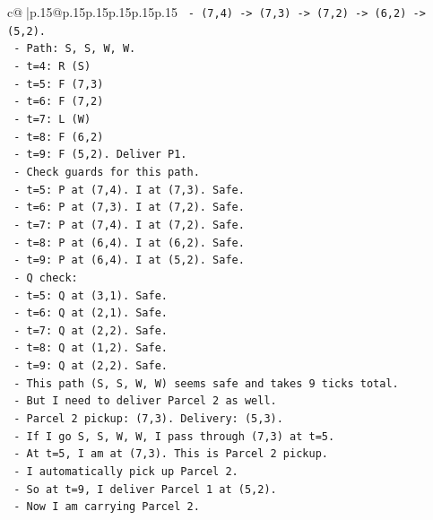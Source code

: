 \documentclass{article}
\begin{document}
{\begin{supertabular}{c@{$\;$}|p{.15\linewidth}@{}p{.15\linewidth}p{.15\linewidth}p{.15\linewidth}p{.15\linewidth}p{.15\linewidth}}
{{{\texttt{          {-} (7,4) {-}> (7,3) {-}> (7,2) {-}> (6,2) {-}> (5,2).} \\
\texttt{          {-} Path: S, S, W, W.} \\
\texttt{          {-} t=4: R (S)} \\
\texttt{          {-} t=5: F (7,3)} \\
\texttt{          {-} t=6: F (7,2)} \\
\texttt{          {-} t=7: L (W)} \\
\texttt{          {-} t=8: F (6,2)} \\
\texttt{          {-} t=9: F (5,2). Deliver P1.} \\
\texttt{          {-} Check guards for this path.} \\
\texttt{          {-} t=5: P at (7,4). I at (7,3). Safe.} \\
\texttt{          {-} t=6: P at (7,3). I at (7,2). Safe.} \\
\texttt{          {-} t=7: P at (7,4). I at (7,2). Safe.} \\
\texttt{          {-} t=8: P at (6,4). I at (6,2). Safe.} \\
\texttt{          {-} t=9: P at (6,4). I at (5,2). Safe.} \\
\texttt{          {-} Q check:} \\
\texttt{          {-} t=5: Q at (3,1). Safe.} \\
\texttt{          {-} t=6: Q at (2,1). Safe.} \\
\texttt{          {-} t=7: Q at (2,2). Safe.} \\
\texttt{          {-} t=8: Q at (1,2). Safe.} \\
\texttt{          {-} t=9: Q at (2,2). Safe.} \\
\texttt{        {-} This path (S, S, W, W) seems safe and takes 9 ticks total.} \\
\texttt{        {-} But I need to deliver Parcel 2 as well.} \\
\texttt{        {-} Parcel 2 pickup: (7,3). Delivery: (5,3).} \\
\texttt{        {-} If I go S, S, W, W, I pass through (7,3) at t=5.} \\
\texttt{        {-} At t=5, I am at (7,3). This is Parcel 2 pickup.} \\
\texttt{        {-} I automatically pick up Parcel 2.} \\
\texttt{        {-} So at t=9, I deliver Parcel 1 at (5,2).} \\
\texttt{        {-} Now I am carrying Parcel 2.} \\
}}}
\end{supertabular}}
\end{document}
